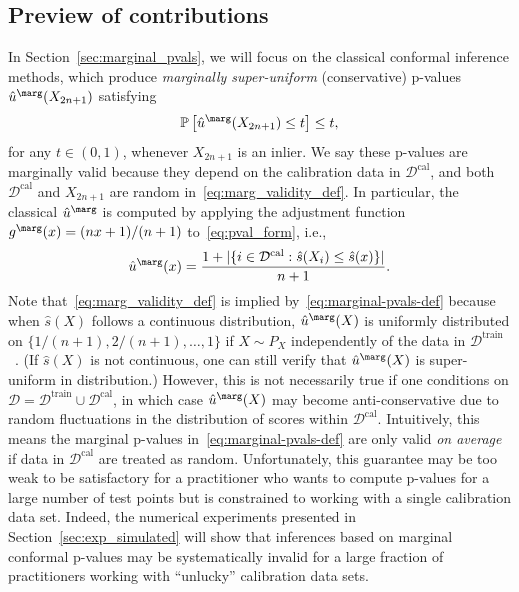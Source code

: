 \subsection{Preview of contributions}
\label{subsec:preview}


In Section~\ref{sec:marginal_pvals}, we will focus on the classical conformal inference methods, which produce \emph{marginally super-uniform} (conservative) p-values $\hat{u}^\marg(X_{2n+1})$ satisfying
\begin{equation}  \label{eq:marg_validity_def}
    \mathbb{P}\left[ \hat{u}^\marg(X_{2n+1}) \le t \right] \le t,
\end{equation}
for any $t \in (0,1)$, whenever $X_{2n+1}$ is an inlier.
We say these p-values are marginally valid because they depend on the calibration data in $\mathcal{D}^{\text{cal}}$, and both $\mathcal{D}^{\text{cal}}$ and $X_{2n+1}$ are random in~\eqref{eq:marg_validity_def}.
In particular, the classical $\hat{u}^\marg$ is computed by applying the adjustment function $g^\marg(x) =  (nx + 1) / (n + 1)$ to~\eqref{eq:pval_form}, i.e.,
\begin{equation} \label{eq:marginal-pvals-def}
    \hat{u}^\marg(x) = \frac{1 + |\{i \in \mathcal{D}^{\text{cal}} : \hat{s}(X_i) \le \hat{s}(x)\}|}{n+1}.
\end{equation}
Note that~\eqref{eq:marg_validity_def} {is implied by}~\eqref{eq:marginal-pvals-def} because {when $\hat{s}(X)$ follows a continuous distribution,} $\hat{u}^\marg(X)$ is uniformly distributed on $\{1/(n+1), 2/(n+1), \dots, 1\}$ if $X \sim P_X$ independently of the data in {$\mathcal{D}^{\text{train}}$~\cite{vovk1999machine, vovk2005algorithmic}.} (If $\hat{s}(X)$ is not continuous, one can still {verify} that $\hat{u}^\marg(X)$ is super-uniform in distribution.)
However, this is not necessarily true if one conditions on $\mathcal{D} = \mathcal{D}^{\text{train}} \cup \mathcal{D}^{\text{cal}}$, in which case $\hat{u}^\marg(X)$ may become anti-conservative due to random fluctuations in the distribution of scores within $\mathcal{D}^{\text{cal}}$.
Intuitively, this means the marginal p-values in~\eqref{eq:marginal-pvals-def} are only valid {\it on average} if data in $\mathcal{D}^{\text{cal}}$ are treated as random. Unfortunately, this guarantee may be too weak to be satisfactory for a practitioner who wants to compute p-values for a large number of test points but is constrained to working with a single calibration data set. Indeed, the numerical experiments presented in Section~\ref{sec:exp_simulated} will show that inferences based on marginal conformal p-values may be systematically invalid for a large fraction of practitioners working with ``unlucky'' calibration data sets.

